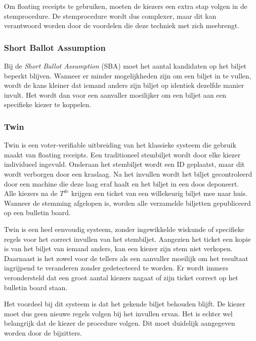 \npar Om floating receipts te gebruiken, moeten de kiezers een extra stap volgen in de stemprocedure. De stemprocedure wordt dus complexer, maar dit kan verantwoord worden door de voordelen die deze techniek met zich meebrengt.

\subsubsection{Short Ballot Assumption}
\label{sec:ls:short_ballot_assumption}

Bij de \textit{Short Ballot Assumption} (SBA) moet het aantal kandidaten op het biljet beperkt blijven. Wanneer er minder mogelijkheden zijn om een biljet in te vullen, wordt de kans kleiner dat iemand anders zijn biljet op identiek dezelfde manier invult. Het wordt dan voor een aanvaller moeilijker om een biljet aan een specifieke kiezer te koppelen.\cite{cichon_kutylowski_weglorz_short_ballot_assumption}

\subsubsection{Twin~\cite{rivest_smith_three_voting_protocols}}
\label{sec:ls:twin}

Twin is een voter-verifiable uitbreiding van het klassieke systeem die gebruik maakt van floating receipts. Een traditioneel stembiljet wordt door elke kiezer individueel ingevuld. Onderaan het stembiljet wordt een ID geplaatst, maar dit wordt verborgen door een kraslaag. Na het invullen wordt het biljet gecontroleerd door een machine die deze laag eraf haalt en het biljet in een doos deponeert. Alle kiezers na de $T^{de}$ krijgen een ticket van een willekeurig biljet mee naar huis. Wanneer de stemming afgelopen is, worden alle verzamelde biljetten gepubliceerd op een bulletin board.

\npar Twin is een heel eenvoudig systeem, zonder ingewikkelde wiskunde of specifieke regels voor het correct invullen van het stembiljet. Aangezien het ticket een kopie is van het biljet van iemand anders, kan een kiezer zijn stem niet verkopen. Daarnaast is het zowel voor de tellers als een aanvaller moeilijk om het resultaat ingrijpend te veranderen zonder gedetecteerd te worden. Er wordt immers verondersteld dat een groot aantal kiezers nagaat of zijn ticket correct op het bulletin board staan.

\npar Het voordeel bij dit systeem is dat het gekende biljet behouden blijft. De kiezer moet dus geen nieuwe regels volgen bij het invullen ervan. Het is echter wel belangrijk dat de kiezer de procedure volgen. Dit moet duidelijk aangegeven worden door de bijzitters.

